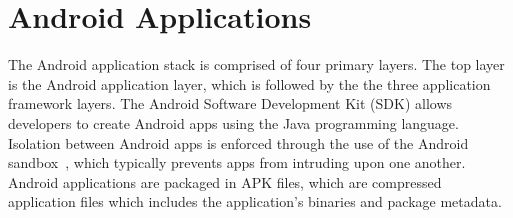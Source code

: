 \documentclass{sig-alternate}
\begin{document}



\section{Android Applications}
\label{sec: androidapplications}


The Android application stack is comprised of four primary layers. The top layer is the Android application layer, which is followed by the the three application framework layers. The Android Software Development Kit (SDK) allows developers to create Android apps using the Java programming language. Isolation between Android apps is enforced through the use of the Android sandbox~\cite{androidsecuritytips_url}, which typically prevents apps from intruding upon one another. Android applications are packaged in APK files, which are compressed application files which includes the application's binaries and package metadata.


%
%
%
%
\end{document}
